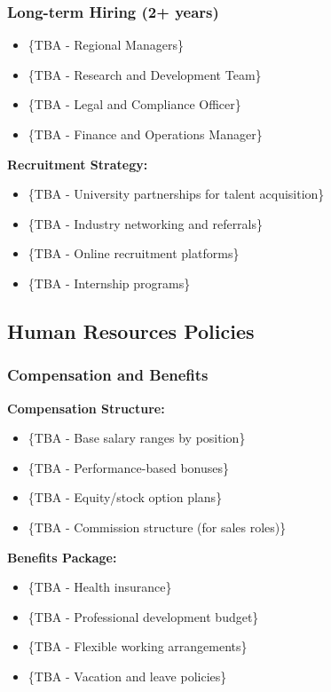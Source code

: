 \subsubsection{Long-term Hiring (2+ years)}
\begin{itemize}
    \item \{TBA - Regional Managers\}
    \item \{TBA - Research and Development Team\}
    \item \{TBA - Legal and Compliance Officer\}
    \item \{TBA - Finance and Operations Manager\}
\end{itemize}

\textbf{Recruitment Strategy:}
\begin{itemize}
    \item \{TBA - University partnerships for talent acquisition\}
    \item \{TBA - Industry networking and referrals\}
    \item \{TBA - Online recruitment platforms\}
    \item \{TBA - Internship programs\}
\end{itemize}

\subsection{Human Resources Policies}
\subsubsection{Compensation and Benefits}
\textbf{Compensation Structure:}
\begin{itemize}
    \item \{TBA - Base salary ranges by position\}
    \item \{TBA - Performance-based bonuses\}
    \item \{TBA - Equity/stock option plans\}
    \item \{TBA - Commission structure (for sales roles)\}
\end{itemize}

\textbf{Benefits Package:}
\begin{itemize}
    \item \{TBA - Health insurance\}
    \item \{TBA - Professional development budget\}
    \item \{TBA - Flexible working arrangements\}
    \item \{TBA - Vacation and leave policies\}
\end{itemize}

